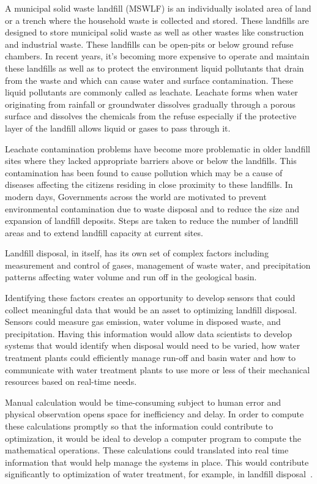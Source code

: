 A municipal solid waste landfill (MSWLF) is an individually isolated area 
of land or a trench where the household waste is collected and stored. 
These landfills are designed to store municipal solid waste as well as other 
wastes like construction and industrial waste. These landfills can be 
open-pits or below ground refuse chambers. In recent years, it's becoming 
more expensive to operate and maintain these landfills as well as to 
protect the environment liquid pollutants that drain from the waste and 
which can cause water and surface contamination. These liquid pollutants 
are commonly called as leachate. Leachate forms when water originating 
from rainfall or groundwater dissolves gradually through a porous surface 
and dissolves the chemicals from the refuse especially if the protective 
layer of the landfill allows liquid or gases to pass through it. 

Leachate contamination problems have become more problematic in older 
landfill sites where they lacked appropriate barriers above or below the 
landfills.  This contamination has been found to cause pollution which may 
be a cause of  diseases affecting the citizens residing in close proximity 
to these landfills. In modern days, Governments across the world are 
motivated to prevent environmental contamination due to waste disposal and 
to reduce the size and expansion of landfill deposits. Steps are taken to 
reduce the number of landfill areas and to extend landfill capacity at 
current sites. 

Landfill disposal, in itself, has its own set of complex factors including 
measurement and control of gases, management of waste water, and precipitation 
patterns affecting water volume and run off  in the geological basin.  

Identifying these factors creates an opportunity to develop sensors that 
could collect meaningful data that would be an asset to optimizing landfill 
disposal.  Sensors could measure gas emission, water volume in disposed 
waste, and precipitation.  Having this information would allow data 
scientists to develop systems that would identify when disposal would need 
to be varied, how water treatment plants could efficiently manage run-off 
and basin water and how to communicate with water treatment plants to use 
more or less of their mechanical resources based on real-time needs. 

Manual calculation would be time-consuming subject to human error and 
physical observation opens space for inefficiency and delay.  In order 
to compute these calculations promptly so that the information could 
contribute to optimization, it would be ideal to develop a computer program 
to compute the mathematical operations.  These calculations could translated 
into real time information that would help manage the systems in place. 
This would contribute significantly to optimization of water treatment, 
for example, in landfill disposal~\cite{akbarpour2016}.

